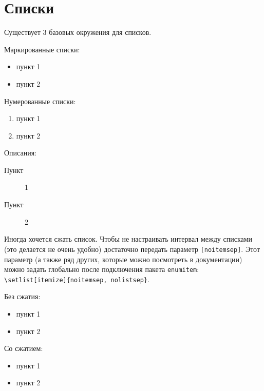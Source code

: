 
\section{Списки}

Существует 3 базовых окружения для списков.

Маркированные списки:
\begin{itemize}
    \item пункт 1
    \item пункт 2
\end{itemize}

Нумерованные списки:
\begin{enumerate}
    \item пункт 1
    \item пункт 2
\end{enumerate}

Описания:
\begin{description}
    \item[Пункт] 1
    \item[Пункт] 2
\end{description}

Иногда хочется сжать список. Чтобы не настраивать интервал между списками (это делается не очень удобно) достаточно передать параметр \texttt{[noitemsep]}. 
Этот параметр (а также ряд других, которые можно посмотреть в документации) можно задать глобально после подключения пакета \texttt{enumitem}: \texttt{\backslash setlist[itemize]\{noitemsep, nolistsep\}}.


Без сжатия:
\begin{itemize}
    \item пункт 1
    \item пункт 2
\end{itemize}

Со сжатием:
\begin{itemize}[noitemsep]
    \item пункт 1
    \item пункт 2
\end{itemize}
